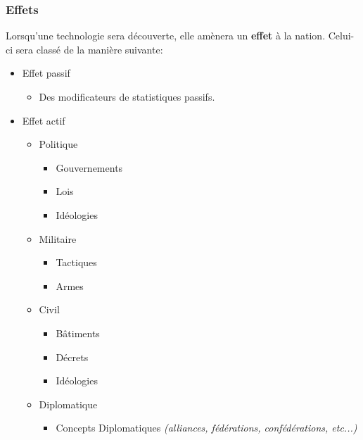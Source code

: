 \documentclass{article}
\begin{document}
            \subsubsection{Effets}
                Lorsqu'une technologie sera découverte, elle amènera un \textbf{effet} à la nation. Celui-ci sera classé de la manière suivante:
                    \begin{itemize}
                        \item Effet passif
                            \begin{itemize}
                                \item Des modificateurs de statistiques passifs.
                            \end{itemize}
                        \item Effet actif
                            \begin{itemize}
                                \item Politique
                                    \begin{itemize}
                                        \item Gouvernements 
                                        \item Lois
                                        \item Idéologies
                                    \end{itemize}
                                \item Militaire
                                    \begin{itemize}
                                        \item Tactiques 
                                        \item Armes
                                    \end{itemize}
                                \item Civil
                                    \begin{itemize}
                                        \item Bâtiments 
                                        \item Décrets
                                        \item Idéologies
                                    \end{itemize}
                                \item Diplomatique
                                    \begin{itemize}
                                        \item Concepts Diplomatiques \emph{(alliances, fédérations, confédérations, etc...)} 
                                    \end{itemize}
                            \end{itemize}   
                    \end{itemize}  
\end{document}
